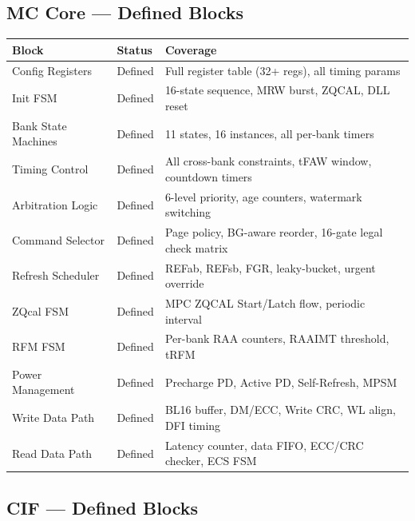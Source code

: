 \documentclass[10pt,a4paper]{article}
\newcommand{\Th}[1]{\cellcolor{thbg}\textbf{\small\color{acc1}#1}}
\newcommand{\RA}{\rowcolor{white}}
\newcommand{\RB}{\rowcolor{altbg}}
\begin{document}
\subsection{MC Core --- Defined Blocks}

\begin{center}
\begin{tabularx}{\linewidth}{@{} l l X @{}}
\toprule
\Th{Block} & \Th{Status} & \Th{Coverage} \\
\midrule
\RA Config Registers    & Defined & Full register table (32+ regs), all timing params \\
\RB Init FSM            & Defined & 16-state sequence, MRW burst, ZQCAL, DLL reset \\
\RA Bank State Machines & Defined & 11 states, 16 instances, all per-bank timers \\
\RB Timing Control      & Defined & All cross-bank constraints, tFAW window, countdown timers \\
\RA Arbitration Logic   & Defined & 6-level priority, age counters, watermark switching \\
\RB Command Selector    & Defined & Page policy, BG-aware reorder, 16-gate legal check matrix \\
\RA Refresh Scheduler   & Defined & REFab, REFsb, FGR, leaky-bucket, urgent override \\
\RB ZQcal FSM           & Defined & MPC ZQCAL Start/Latch flow, periodic interval \\
\RA RFM FSM             & Defined & Per-bank RAA counters, RAAIMT threshold, tRFM \\
\RB Power Management    & Defined & Precharge PD, Active PD, Self-Refresh, MPSM \\
\RA Write Data Path     & Defined & BL16 buffer, DM/ECC, Write CRC, WL align, DFI timing \\
\RB Read Data Path      & Defined & Latency counter, data FIFO, ECC/CRC checker, ECS FSM \\
\bottomrule
\end{tabularx}
\end{center}

\subsection{CIF --- Defined Blocks}
\end{document}
